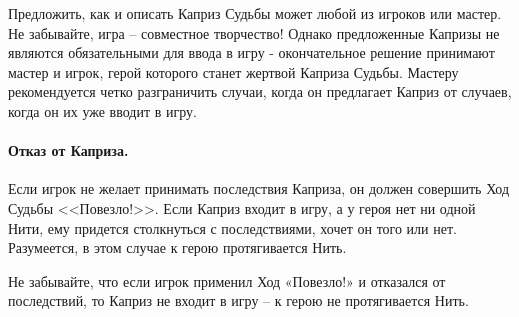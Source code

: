 \begin{tcolorbox}
Предложить, как и описать Каприз Судьбы может любой из игроков или мастер. Не забывайте, игра – совместное творчество! Однако предложенные Капризы не являются обязательными для ввода в игру - окончательное решение принимают мастер и игрок, герой которого станет жертвой Каприза Судьбы.
\newline Мастеру рекомендуется четко разграничить случаи, когда он предлагает Каприз от случаев, когда он их уже вводит в игру.
\end{tcolorbox}
\paragraph{Отказ от Каприза.} Если игрок не желает принимать последствия Каприза, он должен совершить Ход Судьбы <<Повезло!>>. Если Каприз входит в игру, а у героя нет ни одной Нити, ему придется столкнуться с последствиями, хочет он того или нет. Разумеется, в этом случае к герою протягивается Нить.
\begin{tcolorbox}
Не забывайте, что если игрок применил Ход «Повезло!» и отказался от последствий, то Каприз не входит в игру – к герою не протягивается Нить.
\end{tcolorbox}